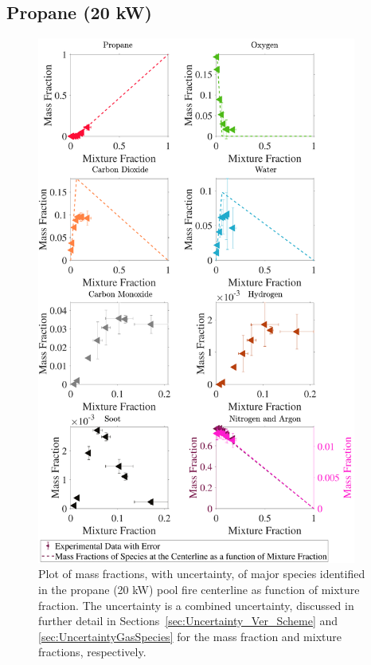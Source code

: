 \documentclass[12pt]{article}
\begin{document}
\subsection{Propane (20 kW)}
\label{ssec:Propane20KW_ALL_Mix_Frac}
\begin{figure}[!h]
	\centering
\includegraphics[width=10.5cm,keepaspectratio]{Propane 20KW_Mixture_Fraction_Major_Plot.pdf}
	\caption[Species mass fractions superimposed on propane (20 kW) state relations]{Plot of mass fractions, with uncertainty, of major species identified in the propane (20 kW) pool fire centerline as function of mixture fraction. The uncertainty is a combined uncertainty, discussed in further detail in Sections~\ref{sec:Uncertainty_Ver_Scheme} and \ref{sec:UncertaintyGasSpecies} for the mass fraction and mixture fractions, respectively.}
	\label{fig:Propane20KW_MIX_Frac_Major}
\end{figure}

\pagebreak
\end{document}
